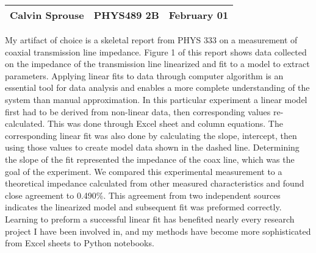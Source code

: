 \documentclass[a4paper, 12pt]{config/homework}
\begin{document}
\noindent
\begin{tabularx}{\textwidth}{>{\centering\arraybackslash}X>{\centering\arraybackslash}X>{\centering\arraybackslash}X}
Calvin Sprouse & PHYS489 2B & 2024 February 01\\
\midrule
\end{tabularx}



\vspace{\baselineskip}
My artifact of choice is a skeletal report from PHYS 333 on a measurement of coaxial transmission line impedance.
Figure 1 of this report shows data collected on the impedance of the transmission line linearized and fit to a model to extract parameters. Applying linear fits to data through computer algorithm is an essential tool for data analysis and enables a more complete understanding of the system than manual approximation.
In this particular experiment a linear model first had to be derived from non-linear data, then corresponding values re-calculated. This was done through Excel sheet and column equations. The corresponding linear fit was also done by calculating the slope, intercept, then using those values to create model data shown in the dashed line.
Determining the slope of the fit represented the impedance of the coax line, which was the goal of the experiment. We compared this experimental measurement to a theoretical impedance calculated from other measured characteristics and found close agreement to 0.490\%. This agreement from two independent sources indicates the linearized model and subsequent fit was preformed correctly. Learning to preform a successful linear fit has benefited nearly every research project I have been involved in, and my methods have become more sophisticated from Excel sheets to Python notebooks.


\end{document}
